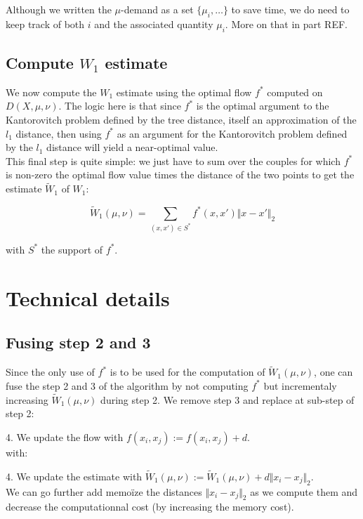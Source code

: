 \documentclass{article}
\begin{document}
Although we written the $\mu$-demand as a set $\lbrace \mu_i, \dots \rbrace$ to save time, we do need to keep track of both $i$ and the associated quantity $\mu_i$. More on that in part REF. 

\subsection{Compute $W_1$ estimate}
We now compute the $W_1$ estimate using the optimal flow $f^*$ computed on $D(X, \mu, \nu)$. The logic here is that since $f^*$ is the optimal argument to the Kantorovitch problem defined by the tree distance, itself an approximation of the $l_1$ distance, then using $f^*$ as an argument for the Kantorovitch problem defined by the $l_1$ distance will yield a near-optimal value.\\

This final step is quite simple: we just have to sum over the couples for which $f^*$ is non-zero the optimal flow value times the distance of the two points to get the estimate $\widetilde{W}_1$ of $W_1$:

$$
\widetilde{W}_1(\mu, \nu) = \sum_{(x, x') \in S^*} f^*(x, x') \Vert x - x' \Vert_2
$$ %

with $S^*$ the support of $f^*$.

\section{Technical details}

\subsection{Fusing step 2 and 3} \label{ssec:fuse23}
Since the only use of $f^*$ is to be used for the computation of $\widetilde{W}_1(\mu, \nu)$, one can fuse the step 2 and 3 of the algorithm by not computing $f^*$ but incrementaly increasing $\widetilde{W}_1(\mu, \nu)$ during step 2. We remove step 3 and replace at sub-step of step 2:

4. We update the flow with $f(x_i, x_j) := f(x_i, x_j) + d$.
\\
with:

4. We update the estimate with $\widetilde{W}_1(\mu, \nu) := \widetilde{W}_1(\mu, \nu) + d \Vert x_i - x_j \Vert_2 $.
\\
We can go further add memoïze the distances $\Vert x_i - x_j \Vert_2$ as we compute them and decrease the computationnal cost (by increasing the memory cost).
\end{document}
